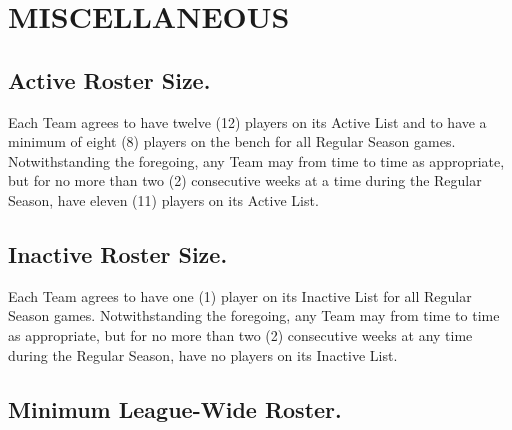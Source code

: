 \documentclass[
]{book}
\begin{document}
\hypertarget{miscellaneous}{%
\chapter{MISCELLANEOUS}\label{miscellaneous}}

\hypertarget{active-roster-size.}{%
\section{Active Roster Size.}\label{active-roster-size.}}

Each Team agrees to have twelve (12) players on its Active List and to have a minimum of eight (8) players on the bench for all Regular Season games. Notwithstanding the foregoing, any Team may from time to time as appropriate, but for no more than two (2) consecutive weeks at a time during the Regular Season, have eleven (11) players on its Active List.

\hypertarget{inactive-roster-size.}{%
\section{Inactive Roster Size.}\label{inactive-roster-size.}}

Each Team agrees to have one (1) player on its Inactive List for all Regular Season games. Notwithstanding the foregoing, any Team may from time to time as appropriate, but for no more than two (2) consecutive weeks at any time during the Regular Season, have no players on its Inactive List.

\hypertarget{minimum-league-wide-roster.}{%
\section{Minimum League-Wide Roster.}\label{minimum-league-wide-roster.}}
\end{document}
